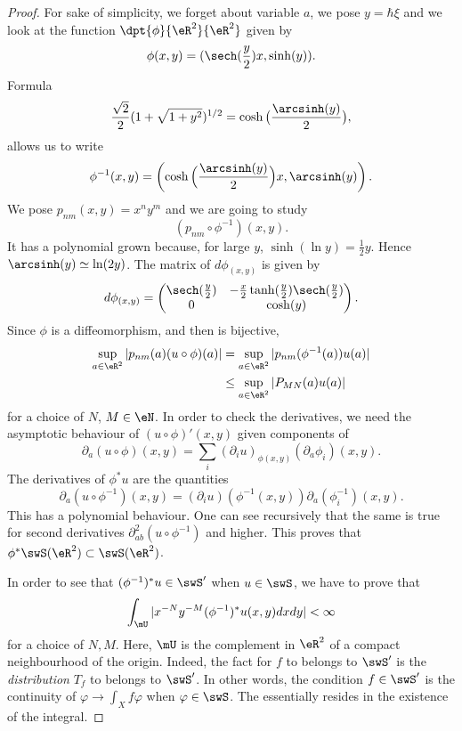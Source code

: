\begin{proof}
For sake of simplicity, we forget about variable $a$, we pose $y=\hbar \xi$ and we look at the function $\dpt{\phi}{\eR^2}{\eR^2}$ given by
\[
  \phi(x,y)=(\sech(\frac{y}{2})x,\sinh(y)).
\]
Formula
\[
  \frac{\sqrt{2}}{2}(1+\sqrt{1+y^2})^{1/2}=\cosh\big( \frac{\arcsinh(y)}{2} \big),
\]
allows us to write
\begin{equation}
\phi^{-1}(x,y)=\left( \cosh\Big( \frac{\arcsinh(y)}{2} \Big)x,\arcsinh(y) \right).
\end{equation}
We pose $p_{nm}(x,y)=x^ny^m$ and we are going to study
\[
  (p_{nm}\circ\phi^{-1})(x,y).
\]
It has a polynomial grown because, for large $y$, $\sinh(\ln y)=\frac{1}{2} y$. Hence $\arcsinh(y)\simeq \ln(2 y)$. The matrix of $d\phi_{(x,y)}$ is given by
\begin{equation}
d\phi_{(x,y)}=
\begin{pmatrix}
\sech(\frac{y}{2}) & -\frac{x}{2}\tanh(\frac{y}{2})\sech(\frac{y}{2})\\
0                  &   \cosh(y)
\end{pmatrix}.
\end{equation}
Since $\phi$ is a diffeomorphism, and then is bijective,
\begin{equation}
\begin{split}
  \sup_{a\in\eR^2}| p_{nm}(a)(u\circ \phi)(a) |&=\sup_{a\in\eR^2}| p_{nm}(\phi^{-1}(a))u(a) |\\
                                               &\leq \sup_{a\in\eR^2}| P_{MN}(a)u(a) |
\end{split}
\end{equation}
for a choice of $N$, $M\in\eN$. In order to check the derivatives, we need the asymptotic behaviour of $(u\circ\phi)'(x,y)$ given components of
\[
  \partial_a(u\circ\phi)(x,y)=\sum_i(\partial_iu)_{\phi(x,y)}(\partial_a\phi_i)(x,y).
\]
The derivatives of $\phi^*u$ are the quantities
\[
  \partial_a(u\circ\phi^{-1})(x,y)=(\partial_iu)(\phi^{-1}(x,y))\partial_a(\phi_i^{-1})(x,y).
\]
This has a polynomial behaviour. One can see recursively that the same is true for second derivatives $\partial^2_{ab}(u\circ\phi^{-1})$ and higher. This proves that $\phi^*\swS(\eR^2)\subset\swS(\eR^2)$.

In order to see that $(\phi^{-1})^*u\in\swS'$ when $u\in\swS$, we have to prove that
\begin{equation} \label{eq:r1181205}
  \int_{\mU}| x^{-N}y^{-M}(\phi^{-1})^*u(x,y)dxdy |<\infty
\end{equation}
for a choice of $N,M$. Here, $\mU$ is the complement in $\eR^2$ of a compact neighbourhood of the origin. Indeed, the fact for $f$ to belongs to $\swS'$ is the \emph{distribution} $T_f$ to belongs to $\swS'$. In other words, the condition $f\in\swS'$ is the continuity of $\varphi\to\int_X f\varphi$ when $\varphi\in\swS$. The essentially resides in the existence of the integral.


\end{proof}
